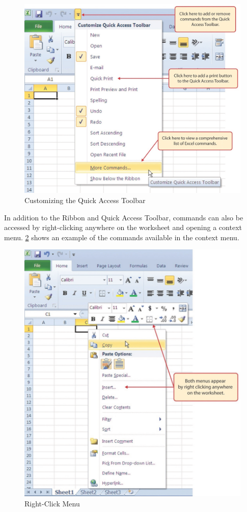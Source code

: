 \begin{figure}[H]
	\centering
	\includegraphics[width=\maxwidth{.95\linewidth}]{gfx/ch01_fig07}
	\caption{Customizing the Quick Access Toolbar}
	\label{01:fig07}
\end{figure}

In addition to the Ribbon and Quick Access Toolbar, commands can also be accessed by right-clicking anywhere on the worksheet and opening a context menu. \ref{01:fig08} shows an example of the commands available in the context menu.

\begin{figure}[H]
	\centering
	\includegraphics[width=\maxwidth{.95\linewidth}]{gfx/ch01_fig08}
	\caption{Right-Click Menu}
	\label{01:fig08}
\end{figure}

